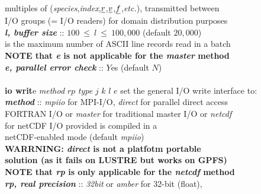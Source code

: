 \begin{tabbing}
\>                                              \> \phantom{xxxx} multiples of ({\em species},{\em index},$\mbox{$\underline{r}$}$,$\mbox{$\underline{v}$}$,$\mbox{$\underline{f}$}$,{\em etc.}), transmitted between \\
\>                                              \> \phantom{xxxx} I/O groups (= I/O readers) for domain distribution purposes \\
\>                                              \> {\bf \em l, buffer size} :: $100~\le~l~\le~100,000$ (default $20,000$) \\
\>                                              \> \phantom{x} is the maximum number of ASCII line records read in a batch \\
\>                                              \> {\bf NOTE that {\em e} is not applicable for the {\em master} method} \\
\>                                              \> \phantom{xxx} {\bf \em e, parallel error check} :: $Y$es (default $N$) \\
\>                                              \> \\
\> {\bf io writ}e {\em method} $rp$ {\em type} $j$ $k$ $l$ $e$ \> set the general I/O write interface to: \\
\>                                              \> {\bf \em method} :: {\em mpiio} for MPI-I/O, {\em direct} for parallel direct access \\
\>                                              \> \phantom{x} FORTRAN I/O or {\em master} for traditional master I/O or {\em netcdf} \\
\>                                              \> \phantom{x} for netCDF I/O provided \D is compiled in a \\
\>                                              \> \phantom{x} netCDF-enabled mode (default {\em mpiio}) \\
\>                                              \> \phantom{x} {\bf WARRNING: {\em direct} is not a platfotm portable} \\
\>                                              \> \phantom{x} {\bf solution (as it fails on LUSTRE but works on GPFS)} \\
\>                                              \> {\bf NOTE that {\em rp} is only applicable for the {\em netcdf} method} \\
\>                                              \> {\bf \em rp, real precision} :: {\em 32bit} or {\em amber} for 32-bit (float), \\

\end{tabbing}
